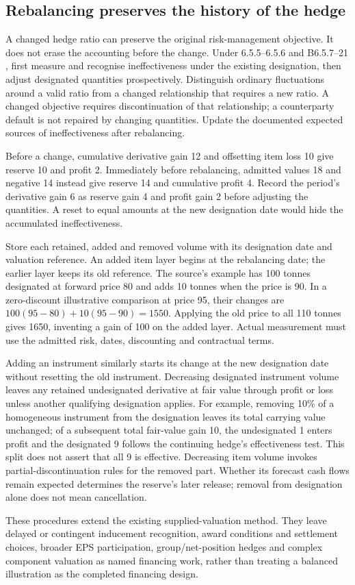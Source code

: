 \hypertarget{rebalancing-preserves-the-history-of-the-hedge}{%
\subsection{Rebalancing preserves the history of the hedge}\label{rebalancing-preserves-the-history-of-the-hedge}}

A changed hedge ratio can preserve the original risk-management objective. It does not erase the accounting before the change. Under 6.5.5--6.5.6 and B6.5.7--21 \citep[6.5.5--6.5.6 and B6.5.7--21]{aasb9dated}, first measure and recognise ineffectiveness under the existing designation, then adjust designated quantities prospectively. Distinguish ordinary fluctuations around a valid ratio from a changed relationship that requires a new ratio. A changed objective requires discontinuation of that relationship; a counterparty default is not repaired by changing quantities. Update the documented expected sources of ineffectiveness after rebalancing.

Before a change, cumulative derivative gain 12 and offsetting item loss 10 give reserve 10 and profit 2. Immediately before rebalancing, admitted values 18 and negative 14 instead give reserve 14 and cumulative profit 4. Record the period's derivative gain 6 as reserve gain 4 and profit gain 2 before adjusting the quantities. A reset to equal amounts at the new designation date would hide the accumulated ineffectiveness.

Store each retained, added and removed volume with its designation date and valuation reference. An added item layer begins at the rebalancing date; the earlier layer keeps its old reference. The source's example has 100 tonnes designated at forward price 80 and adds 10 tonnes when the price is 90. In a zero-discount illustrative comparison at price 95, their changes are \(100(95-80)+10(95-90)=1550\). Applying the old price to all 110 tonnes gives 1650, inventing a gain of 100 on the added layer. Actual measurement must use the admitted risk, dates, discounting and contractual terms.

Adding an instrument similarly starts its change at the new designation date without resetting the old instrument. Decreasing designated instrument volume leaves any retained undesignated derivative at fair value through profit or loss unless another qualifying designation applies. For example, removing 10\% of a homogeneous instrument from the designation leaves its total carrying value unchanged; of a subsequent total fair-value gain 10, the undesignated 1 enters profit and the designated 9 follows the continuing hedge's effectiveness test. This split does not assert that all 9 is effective. Decreasing item volume invokes partial-discontinuation rules for the removed part. Whether its forecast cash flows remain expected determines the reserve's later release; removal from designation alone does not mean cancellation.

These procedures extend the existing supplied-valuation method. They leave delayed or contingent inducement recognition, award conditions and settlement choices, broader EPS participation, group/net-position hedges and complex component valuation as named financing work, rather than treating a balanced illustration as the completed financing design.
